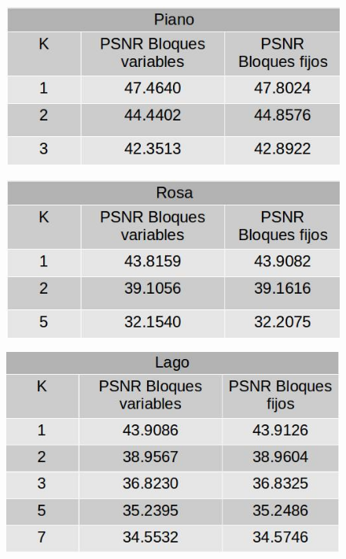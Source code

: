 \documentclass[a4paper]{article}
\begin{document}
     \begin{figure}[H]
    \centering
    \includegraphics[scale=0.4]{imagenes/pianoMetodosDif.jpg}
	\label{autoe}
    \end{figure}
    
    
     \begin{figure}[H]
    \centering
    \includegraphics[scale=0.4]{imagenes/rosaMetodosDif.jpg}
	\label{autoe}
    \end{figure}

 \begin{figure}[H]
    \centering
    \includegraphics[scale=0.4]{imagenes/lagoMetodosDif.jpg}
	\label{autoe}
    \end{figure}
    
\end{document}
